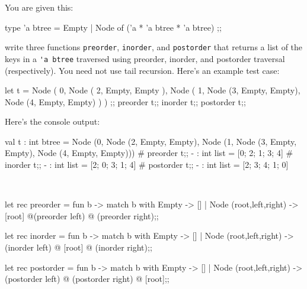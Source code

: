 

\renewcommand\AUTHOR{nweadick1@cougars.ccis.edu} %


\topmattertwo


\nextq
You are given this:
\begin{console}[fontsize=\small]
type 'a btree = Empty
              | Node of ('a * 'a btree * 'a btree)
;;
\end{console}
write three functions \verb!preorder!, \verb!inorder!, and \verb!postorder!
that returns a list of the keys in a \verb!'a btree! traversed using
preorder, inorder, and postorder traversal (respectively).
You need not use tail recursion.
Here's an example test case:
\begin{console}[fontsize=\small]
let t =
  Node (
    0,
    Node (
      2,
      Empty,
      Empty
    ),
    Node (
      1,
      Node (3, Empty, Empty),
      Node (4, Empty, Empty)
    )
  )
;;
preorder t;;
inorder t;;
postorder t;;
\end{console}
Here's the console output:
\begin{console}[fontsize=\small]
val t : int btree =
  Node
   (0, Node (2, Empty, Empty),
    Node (1, Node (3, Empty, Empty), Node (4, Empty, Empty)))
# preorder t;;
- : int list = [0; 2; 1; 3; 4]
# inorder t;;
- : int list = [2; 0; 3; 1; 4]
# postorder t;;
- : int list = [2; 3; 4; 1; 0]
\end{console}
\\
\ANSWER
\begin{answercode}
let rec preorder = fun b -> match b with Empty -> []
| Node (root,left,right) -> [root]  @(preorder left) @ (preorder right);;


let rec inorder = fun b -> match b with Empty -> []
| Node (root,left,right) ->  (inorder left) @ [root] @ (inorder right);;

let rec postorder = fun b -> match b with Empty -> []
| Node (root,left,right) ->  (postorder left) @ (postorder right) @ [root];;
\end{answercode}


\newpage


